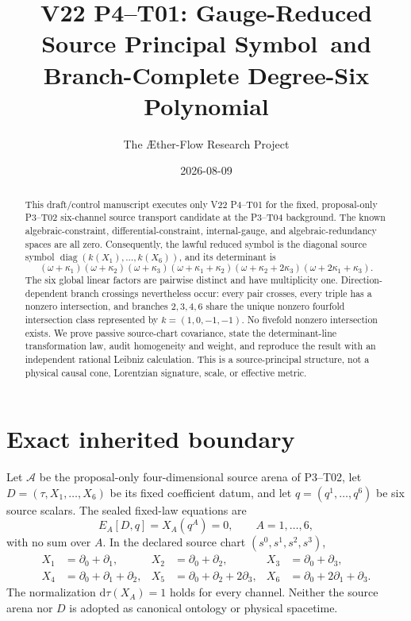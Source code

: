 \documentclass[11pt]{article}
\title{V22 P4--T01: Gauge-Reduced Source Principal Symbol\
and Branch-Complete Degree-Six Polynomial}
\author{The \AE ther-Flow Research Project}
\date{2026-08-09}
\newcommand{\A}{\mathcal A}
\begin{document}
\maketitle

\begin{abstract}
This draft/control manuscript executes only V22 P4--T01 for the fixed,
proposal-only P3--T02 six-channel source transport candidate at the P3--T04
background.  The known algebraic-constraint, differential-constraint,
internal-gauge, and algebraic-redundancy spaces are all zero.  Consequently,
the lawful reduced symbol is the diagonal source symbol
$\operatorname{diag}(k(X_1),\ldots,k(X_6))$, and its determinant is
\[
 (\omega+\kappa_1)(\omega+\kappa_2)(\omega+\kappa_3)
 (\omega+\kappa_1+\kappa_2)(\omega+\kappa_2+2\kappa_3)
 (\omega+2\kappa_1+\kappa_3).
\]
The six global linear factors are pairwise distinct and have multiplicity one.
Direction-dependent branch crossings nevertheless occur: every pair crosses,
every triple has a nonzero intersection, and branches $2,3,4,6$ share the
unique nonzero fourfold intersection class represented by
$k=(1,0,-1,-1)$.  No fivefold nonzero intersection exists.  We prove passive
source-chart covariance, state the determinant-line transformation law, audit
homogeneity and weight, and reproduce the result with an independent rational
Leibniz calculation.  This is a source-principal structure, not a physical
causal cone, Lorentzian signature, scale, or effective metric.
\end{abstract}

\section{Exact inherited boundary}

Let $\A$ be the proposal-only four-dimensional source arena of P3--T02, let
$D=(\tau,X_1,\ldots,X_6)$ be its fixed coefficient datum, and let
$q=(q^1,\ldots,q^6)$ be six source scalars.  The sealed fixed-law equations are
\begin{equation}
  E_A[D,q]=X_A(q^A)=0,
  \qquad A=1,\ldots,6,
  \label{eq:law}
\end{equation}
with no sum over $A$.  In the declared source chart
$(s^0,s^1,s^2,s^3)$,
\begin{align}
 X_1&=\partial_0+\partial_1,
 &X_2&=\partial_0+\partial_2,
 &X_3&=\partial_0+\partial_3,\nonumber\\
 X_4&=\partial_0+\partial_1+\partial_2,
 &X_5&=\partial_0+\partial_2+2\partial_3,
 &X_6&=\partial_0+2\partial_1+\partial_3.
 \label{eq:vectors}
\end{align}
The normalization $\mathrm d\tau(X_A)=1$ holds for every channel.  Neither the
source arena nor $D$ is adopted as canonical ontology or physical spacetime.
\end{document}
